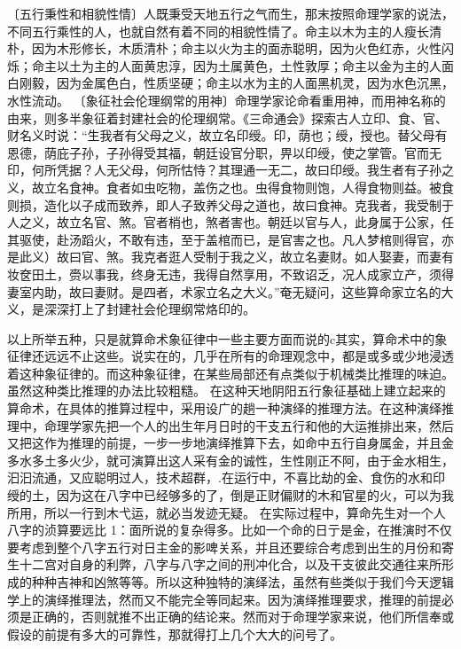 {{〔五行秉性和相貌性情〕人既秉受天地五行之气而生，那末按照命理学家的说法，不同五行乘性的人，也就自然有着不同的相貌性情了。命主以木为主的人瘦长清朴，因为木形修长，木质清朴；命主以火为主的面赤聪明，因为火色红赤，火性闪烁；命主以土为主的人面黄忠淳，因为土属黄色，土性敦厚；命主以金为主的人面白刚毅，因为金属色白，性质坚硬；命主以水为主的人面黑机灵，因为水色沉黑，水性流动。
〔象征社会伦理纲常的用神〕命理学家论命看重用神，而用神名称的由来，则多半象征着封建社会的伦理纲常。《三命通会》探索古人立印、食、官、财名义时说：“生我者有父母之义，故立名印绶。印，荫也；绶，授也。替父母有恩德，荫庇子孙，子孙得受其福，朝廷设官分职，畀以印绶，使之掌管。官而无印，何所凭据？人无父母，何所怙恃？其理通一无二，故曰印绶。我生者有子孙之义，故立名食神。食者如虫吃物，盖伤之也。虫得食物则饱，人得食物则益。被食则损，造化以子成而致养，即人子致养父母之道也，故曰食神。克我者，我受制于人之义，故立名官、煞。官者梢也，煞者害也。朝廷以官与人，此身属于公家，任其驱使，赴汤蹈火，不敢有违，至于盖棺而已，是官害之也。凡人梦棺则得官，亦是此义）故曰官、煞。我克者逛人受制于我之义，故立名妻财。如人娶妻，而妻有妆奁田土，赍以事我，终身无违，我得自然享用，不致诏乏，况人成家立产，须得妻室内助，故曰妻财。是四者，术家立名之大义。”奄无疑问，这些算命家立名的大义，是深深打上了封建社会伦理纲常烙印的。

以上所举五种，只是就算命术象征律中一些主要方面而说的c其实，算命术中的象征律还远远不止这些。说实在的，几乎在所有的命理观念中，都是或多或少地浸透着这种象征律的。而这种象征律，在某些局部还有点类似于机械类比推理的味迫。虽然这种类比推理的办法比较粗糙。
在这种天地阴阳五行象征基础上建立起来的算命术，在具体的推算过程中，采用设广的趟一种演绎的推理方法。在这种演绎推理中，命理学家先把一个人的出生年月日时的干支五行和他的大运推排出来，然后又把这作为推理的前提，一步一步地演绎推算下去，如命中五行自身属金，并且金多水多土多火少，就可演算出这人采有金的诚性，生性刚正不阿，由于金水相生，汩汩流通，又应聪明过人，技术超群，.在运行中，不喜比劫的金、食伤的水和印绶的土，因为这在八字中已经够多的了，倒是正财偏财的木和官星的火，可以为我所用，所以一行到木弋运，就必当发迹无疑。
在实际过程中，算命先生对一个人八字的浈算要远比
1：面所说的复杂得多。比如一个命的日亍是金，在推演时不仅要考虑到整个八字五行对日主金的影啤关系，并且还要综合考虑到出生的月份和寄生十二宫对自身的利弊，八字与八字之间的刑冲化合，以及干支彼此交通往来所形成的种种吉神和凶煞等等。所以这种独特的演绎法，虽然有些类似于我们今天逻辑学上的演绎推理法，然而又不能完全等同起来。因为演绎推理要求，推理的前提必须是正确的，否则就推不出正确的结论来。然而对于命理学家来说，他们所信奉或假设的前提有多大的可靠性，那就得打上几个大大的问号了。

}}
